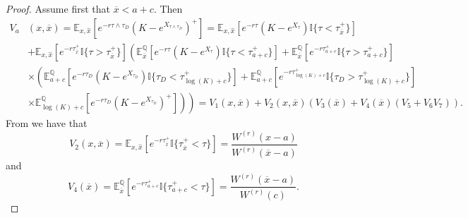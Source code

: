 \documentclass[10pt,a4paper]{amsart}
\def\E{{\mathbb{E}}}
\def\Eq{{\mathbb{E}
		_{x,\hat{x}}}}
\def\Q{{\mathbb{Q}}}
\def \R{{{\rm I{\!}\rm R}}}
\def \I{{\mathbb{I}}}
\def\E{{\mathbb E}} \def\PP{\mc P} \def\Z{{\mathbb Z}} \def\R{{\mathbb R}}
\begin{document}
	\begin{proof}
		Assume first that $\overline{x} < a+c$. Then
		\begin{align*}
			V_a&(x,\overline{x}) = \Eq \left[ e^{-r\tau\wedge\tau_D} \left( K - e^{X_{\tau\wedge\tau_D}} \right)^+ \right] =  \Eq\left[ e^{-r\tau} \left( K - e^{X_\tau} \right) \I
			\{ \tau < \tau_{\overline{x}}^+ \} \right]  \\
			\nonumber & +  \Eq\left[ e^{-r\tau_{\overline{x}}^+} \I
			\{ \tau > \tau_{\overline{x}}^+ \} \right]\left( \E^\Q_{\overline{x}}\left[ e^{-r\tau} \left( K - e^{X_\tau} \right) \I
			\{ \tau < \tau_{a+c}^+ \} \right] + \E^\Q_{\overline{x}}\left[ e^{-r\tau_{a+c}^+} \I
			\{ \tau > \tau_{a+c}^+ \} \right]  \right. \\
			\nonumber &  \times \left(
			\E^\Q_{a+c}\left[ e^{-r\tau_D} \left( K - e^{X_{\tau_D}} \right) \I
			\{ \tau_D < \tau_{\log(K)+c}^+ \} \right] +
			\E^\Q_{a+c}\left[ e^{-r\tau_{\log(K)+c}^+}  \I
			\{ \tau_D > \tau_{\log(K)+c}^+ \} \right] \right. \\
			\nonumber & \times \left. \left.
			\E^\Q_{\log(K)+c}\left[ e^{-r\tau_D} \left( K - e^{X_{\tau_D}} \right)^+ \right]
			\right) \right) = V_1(x,\overline{x}) + V_2(x,\overline{x}) ( V_3(\overline{x}) +  V_4(\overline{x})(  V_5 + V_6 V_7  )   ).
		\end{align*}	
			From \cite[eq. (2.3)]{MP} we have that
			\begin{equation}\label{V2}
				V_2(x, \overline{x}) = \Eq \left[ e^{-r\tau^+_{\overline{x}}} \I \{ \tau^+_{\overline{x}} < \tau \} \right] = \frac{W^{(r)}(x-a)}{W^{(r)}(\overline{x}-a)}
			\end{equation}
			and
			\begin{equation}\label{V4}
				V_4(\overline{x}) = \E^\Q_{\overline{x}} \left[ e^{-r\tau^+_{a+c}} \I\{ \tau^+_{a+c} < \tau \} \right] = \frac{W^{(r)}(\overline{x}-a)}{W^{(r)}(c)}.
			\end{equation}
			

\end{proof}
\end{document}
